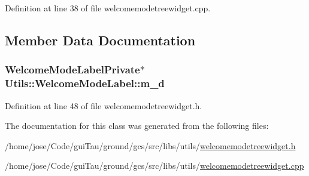 Definition at line 38 of file welcomemodetreewidget.\-cpp.



\subsection{Member Data Documentation}
\hypertarget{class_utils_1_1_welcome_mode_label_a1d69ec538fa784b0c5524d325a11f9a5}{
\subsubsection[{m\-\_\-d}]{\setlength{\rightskip}{0pt plus 5cm}Welcome\-Mode\-Label\-Private$\ast$ Utils\-::\-Welcome\-Mode\-Label\-::m\-\_\-d}}\label{class_utils_1_1_welcome_mode_label_a1d69ec538fa784b0c5524d325a11f9a5}


Definition at line 48 of file welcomemodetreewidget.\-h.



The documentation for this class was generated from the following files\-:\begin{DoxyCompactItemize}
\item 
/home/jose/\-Code/gui\-Tau/ground/gcs/src/libs/utils/\hyperlink{welcomemodetreewidget_8h}{welcomemodetreewidget.\-h}\item 
/home/jose/\-Code/gui\-Tau/ground/gcs/src/libs/utils/\hyperlink{welcomemodetreewidget_8cpp}{welcomemodetreewidget.\-cpp}\end{DoxyCompactItemize}
